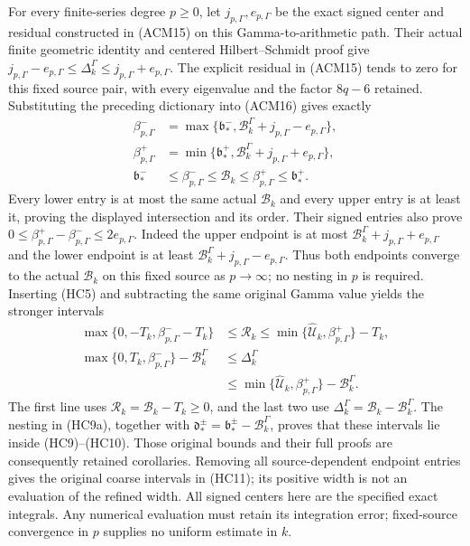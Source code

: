 For every finite-series degree $p\ge0$, let
$j_{p,\Gamma},e_{p,\Gamma}$ be the exact signed center and residual
constructed in (ACM15) on this Gamma-to-arithmetic path.
Their actual finite geometric identity and centered
Hilbert--Schmidt proof give
$j_{p,\Gamma}-e_{p,\Gamma}\le\Delta_k^\Gamma
\le j_{p,\Gamma}+e_{p,\Gamma}$.
The explicit residual in (ACM15) tends to zero for this fixed
source pair, with every eigenvalue and the factor $8q-6$ retained.
Substituting the preceding dictionary into (ACM16) gives exactly
\[
\begin{aligned}
 \beta_{p,\Gamma}^-&=
 \max\{\mathfrak b_*^-,
                  \mathcal B_k^\Gamma+j_{p,\Gamma}-e_{p,\Gamma}\},\\
 \beta_{p,\Gamma}^+&=
 \min\{\mathfrak b_*^+,
                  \mathcal B_k^\Gamma+j_{p,\Gamma}+e_{p,\Gamma}\},\\
 \mathfrak b_*^-&\le\beta_{p,\Gamma}^-
 \le\mathcal B_k\le\beta_{p,\Gamma}^+\le\mathfrak b_*^+ .
\end{aligned}\tag{HC9a}
\]
Every lower entry is at most the same actual $\mathcal B_k$ and
every upper entry is at least it, proving the displayed
intersection and its order. Their signed entries also prove
$0\le\beta_{p,\Gamma}^+-\beta_{p,\Gamma}^-\le2e_{p,\Gamma}$.
Indeed the upper endpoint is at most
$\mathcal B_k^\Gamma+j_{p,\Gamma}+e_{p,\Gamma}$ and the lower
endpoint is at least
$\mathcal B_k^\Gamma+j_{p,\Gamma}-e_{p,\Gamma}$.
Thus both endpoints converge to the actual $\mathcal B_k$ on
this fixed source as $p\to\infty$; no nesting in $p$ is required.
Inserting (HC5) and subtracting the
same original Gamma value yields the stronger intervals
\[
\begin{aligned}
 \max\{0,-T_k,\beta_{p,\Gamma}^--T_k\}
 &\le\mathcal R_k
 \le\min\{\widehat{\mathcal U}_k,\beta_{p,\Gamma}^+\}-T_k,\\
 \max\{0,T_k,\beta_{p,\Gamma}^-\}-\mathcal B_k^\Gamma
 &\le\Delta_k^\Gamma\\
 &\le\min\{\widehat{\mathcal U}_k,\beta_{p,\Gamma}^+\}
                         -\mathcal B_k^\Gamma .
\end{aligned}\tag{HC10a}
\]
The first line uses $\mathcal R_k=\mathcal B_k-T_k\ge0$,
and the last two use $\Delta_k^\Gamma=\mathcal B_k-\mathcal B_k^\Gamma$.
The nesting in (HC9a), together with
$\mathfrak d_*^\pm=\mathfrak b_*^\pm-\mathcal B_k^\Gamma$,
proves that these intervals lie inside (HC9)--(HC10).
Those original bounds and their full proofs are consequently
retained corollaries. Removing all source-dependent endpoint
entries gives the original coarse intervals in (HC11); its
positive width is not an evaluation of the refined width.
All signed centers here are the specified exact integrals.
Any numerical evaluation must retain its integration error;
fixed-source convergence in $p$ supplies no uniform estimate in $k$.
